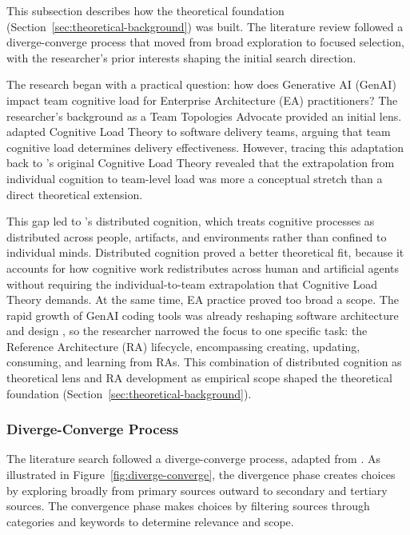 This subsection describes how the theoretical foundation
(Section~\ref{sec:theoretical-background}) was built. The literature review
followed a diverge-converge process
\parencite{botjes_antifragile_2020} that moved from broad exploration to
focused selection, with the researcher's prior interests shaping the initial
search direction.

The research began with a practical question: how does Generative AI (GenAI)
impact team cognitive load for Enterprise Architecture (EA) practitioners? The
researcher's background as a Team Topologies Advocate
\parencite{skelton_team_topologies_2019} provided an initial lens.
\textcite{skelton_team_topologies_2019} adapted Cognitive Load Theory
\parencite{sweller_cognitive_1988} to software delivery teams, arguing that team
cognitive load determines delivery effectiveness. However, tracing this
adaptation back to \textcite{sweller_cognitive_1988}'s original Cognitive Load
Theory revealed that the extrapolation from individual cognition to team-level
load was more a conceptual stretch than a direct theoretical extension.

This gap led to \textcite{hutchins_cognition_1995}'s distributed cognition,
which treats cognitive processes as distributed across people, artifacts, and
environments rather than confined to individual minds. Distributed cognition
proved a better theoretical fit, because it accounts for how cognitive work
redistributes across human and artificial agents without requiring the
individual-to-team extrapolation that Cognitive Load Theory demands. At the same
time, EA practice proved too broad a scope. The rapid growth of GenAI coding
tools was already reshaping software architecture and design
\parencite{peng_impact_2023}, so the researcher narrowed the focus to one
specific task: the Reference Architecture (RA) lifecycle, encompassing creating,
updating, consuming, and learning from RAs. This combination of distributed
cognition as theoretical lens and RA development as empirical scope shaped the
theoretical foundation (Section~\ref{sec:theoretical-background}).

\subsubsection{Diverge-Converge Process}

The literature search followed a diverge-converge process, adapted from
\textcite{botjes_antifragile_2020}. As illustrated in
Figure~\ref{fig:diverge-converge}, the divergence phase creates choices by
exploring broadly from primary sources outward to secondary and tertiary
sources. The convergence phase makes choices by filtering sources through
categories and keywords to determine relevance and scope.

